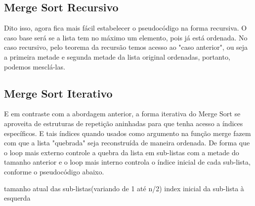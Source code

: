 \FloatBarrier

\newpage

\subsection{Merge Sort Recursivo}

Dito isso, agora fica mais fácil estabelecer o pseudocódigo na forma recursiva. O caso base será se a lista tem no máximo um elemento, pois já está ordenada. No caso recursivo, pelo teorema da recursão temos acesso ao "caso anterior", ou seja a primeira metade e segunda metade da lista original ordenadas, portanto, podemos mesclá-las.

\begin{algorithm}
	\label{algo:merge_sort_pseudo}
	\begin{algorithmic}[1]
		 \Return
		\EndIf
		\State {}
		\EndFunction
	\end{algorithmic}
\end{algorithm}

\FloatBarrier

\subsection{Merge Sort Iterativo}

E em contraste com a abordagem anterior, a forma iterativa do Merge Sort se aproveita de estruturas de repetição aninhadas para que tenha acesso a índices específicos. E tais índices quando usados como argumento na função merge fazem com que a lista "quebrada" seja reconstruída de maneira ordenada. De forma que o loop mais externo controle a quebra da lista em sub-listas com a metade do tamanho anterior e o loop mais interno controla o índice inicial de cada sub-lista, conforme o pseudocódigo abaixo.

\begin{algorithm}
	\label{algo:merge_sort_it_pseudo}
	\begin{algorithmic}[1]
		\Comment tamanho atual das sub-listas(variando de 1 até n/2)
		\Comment index inicial da sub-lista à esquerda


		\EndFor
		\EndFor
		\EndFunction
	\end{algorithmic}
\end{algorithm}


